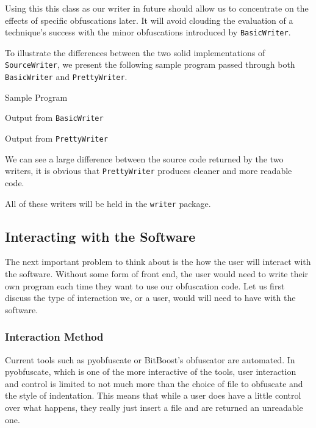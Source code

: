 \documentclass[twoside,a4paper]{report}
\begin{document}
Using this this class as our writer in future should allow us to concentrate on the effects of specific obfuscations later. It will avoid clouding the evaluation
of a technique's success with the minor obfuscations introduced by \texttt{BasicWriter}.

To illustrate the differences between the two solid implementations of \texttt{SourceWriter}, we present the following sample program passed
through both \texttt{BasicWriter} and \texttt{PrettyWriter}.

Sample Program



Output from \texttt{BasicWriter}



Output from \texttt{PrettyWriter}



We can see a large difference between the source code returned by the two writers, it is obvious that
\texttt{PrettyWriter} produces cleaner and more readable code.

All of these writers will be held in the \texttt{writer} package.

\subsection{Interacting with the Software}

The next important problem to think about is the how the user will interact with the software. Without some form of front end, the
user would need to write their own program each time they want to use our obfuscation code. Let us first discuss the type of
interaction we, or a user, would will need to have with the software.

\subsubsection{Interaction Method}

Current tools such as pyobfuscate or BitBoost's obfuscator are automated. In pyobfuscate, which is one of the more interactive
of the tools, user interaction and control is limited to not much more than the choice of file to obfuscate and the style of indentation. This means
that while a user does have a little control over what happens, they really just insert a file and are returned an
unreadable one.
\end{document}

